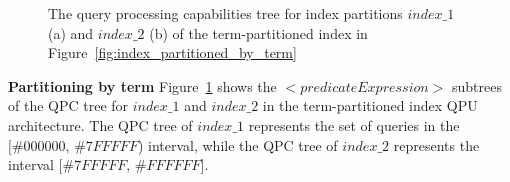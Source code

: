 \begin{figure}

\caption{The query processing capabilities tree for index partitions $index\_1$ (a) and $index\_2$ (b) of the term-partitioned
index in Figure~\ref{fig:index_partitioned_by_term}}
\label{fig:qpt_index_partitioning_terms}
\end{figure}

\medskip
\noindent
\textbf{Partitioning by term}
Figure~\ref{fig:qpt_index_partitioning_terms} shows the $<predicateExpression>$ subtrees of the QPC tree for $index\_1$ and $index\_2$ in the term-partitioned index QPU
architecture.
The QPC tree of $index\_1$ represents the set of queries in the $[\#000000$, $\#7FFFFF$) interval,
while the QPC tree of $index\_2$ represents the interval $[\#7FFFFF$, $\#FFFFFF$].


